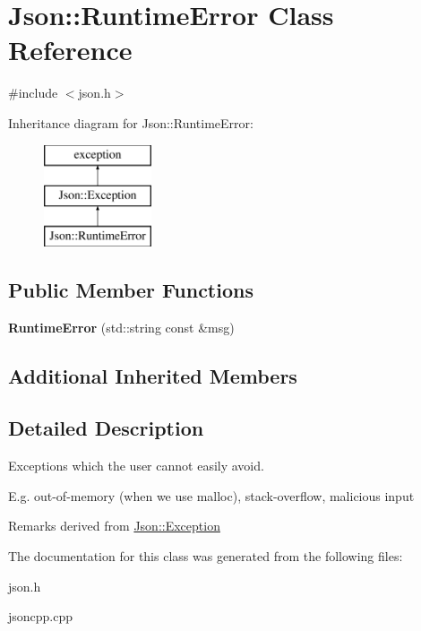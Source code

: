 \hypertarget{class_json_1_1_runtime_error}{\section{Json\-:\-:Runtime\-Error Class Reference}
\label{class_json_1_1_runtime_error}
}


{\ttfamily \#include $<$json.\-h$>$}

Inheritance diagram for Json\-:\-:Runtime\-Error\-:\begin{figure}[H]
\begin{center}
\leavevmode
\includegraphics[height=3.000000cm]{class_json_1_1_runtime_error}
\end{center}
\end{figure}
\subsection*{Public Member Functions}
\begin{DoxyCompactItemize}
\item 
\hypertarget{class_json_1_1_runtime_error_ae4f102d5c1efb773887efc8c7911e6f8}{{\bfseries Runtime\-Error} (std\-::string const \&msg)}\label{class_json_1_1_runtime_error_ae4f102d5c1efb773887efc8c7911e6f8}

\end{DoxyCompactItemize}
\subsection*{Additional Inherited Members}


\subsection{Detailed Description}
Exceptions which the user cannot easily avoid.

E.\-g. out-\/of-\/memory (when we use malloc), stack-\/overflow, malicious input

\begin{DoxyRemark}{Remarks}
derived from \hyperlink{class_json_1_1_exception}{Json\-::\-Exception} 
\end{DoxyRemark}


The documentation for this class was generated from the following files\-:\begin{DoxyCompactItemize}
\item 
json.\-h\item 
jsoncpp.\-cpp\end{DoxyCompactItemize}
